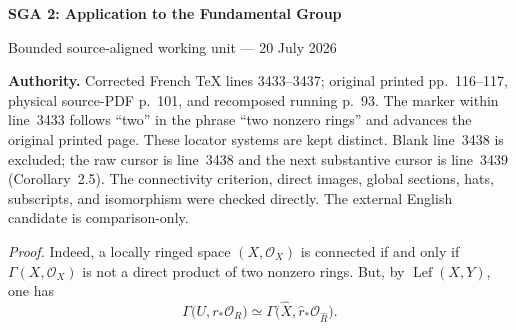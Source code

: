\documentclass[10pt,a4paper]{article}
\newcommand{\Lefc}{\operatorname{Lef}}
\begin{document}
\begin{center}
  {\Large\bfseries SGA 2: Application to the Fundamental Group}\par\smallskip
  {\large Bounded source-aligned working unit --- 20 July 2026}
\end{center}
\noindent\colorbox{softgray}{\parbox{0.95\linewidth}{\footnotesize\textbf{Authority.}
Corrected French TeX lines 3433--3437; original printed pp.~116--117,
physical source-PDF p.~101, and recomposed running p.~93. The
\texttt{\string\pageoriginale} marker within line~3433 follows “two” in the
phrase “two nonzero rings” and advances the original printed page. These
locator systems are kept distinct. Blank line~3438 is excluded; the raw
cursor is line~3438 and the next substantive cursor is line~3439
(Corollary~2.5). The connectivity criterion, direct images, global sections,
hats, subscripts, and isomorphism were checked directly. The external English
candidate is comparison-only.}}

\medskip
\noindent\textit{Proof.}
Indeed, a locally ringed space $(X,\mathcal O_X)$ is connected if and only if
$\Gamma(X,\mathcal O_X)$ is not a direct product of two nonzero rings. But,
by $\Lefc(X,Y)$, one has
\[
  \Gamma\bigl(U,r_*\mathcal O_R\bigr)
  \simeq
  \Gamma\bigl(\widehat X,\widehat r_*\mathcal O_{\widehat R}\bigr).
\]
\end{document}
